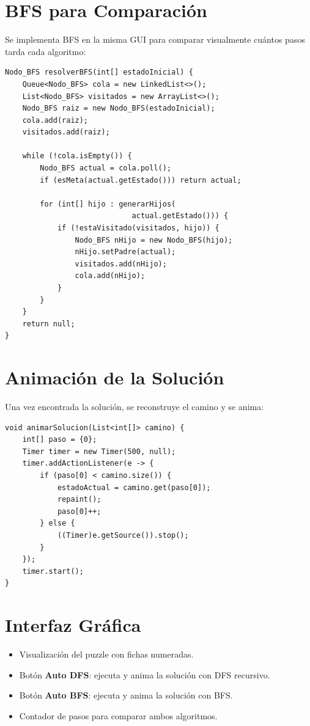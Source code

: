 \documentclass[12pt,a4paper]{article}
\begin{document}
\section{BFS para Comparación}

Se implementa BFS en la misma GUI para comparar visualmente cuántos pasos tarda cada algoritmo:

\begin{lstlisting}
Nodo_BFS resolverBFS(int[] estadoInicial) {
    Queue<Nodo_BFS> cola = new LinkedList<>();
    List<Nodo_BFS> visitados = new ArrayList<>();
    Nodo_BFS raiz = new Nodo_BFS(estadoInicial);
    cola.add(raiz);
    visitados.add(raiz);

    while (!cola.isEmpty()) {
        Nodo_BFS actual = cola.poll();
        if (esMeta(actual.getEstado())) return actual;

        for (int[] hijo : generarHijos(
                             actual.getEstado())) {
            if (!estaVisitado(visitados, hijo)) {
                Nodo_BFS nHijo = new Nodo_BFS(hijo);
                nHijo.setPadre(actual);
                visitados.add(nHijo);
                cola.add(nHijo);
            }
        }
    }
    return null;
}
\end{lstlisting}

\section{Animación de la Solución}

Una vez encontrada la solución, se reconstruye el camino y se anima:

\begin{lstlisting}
void animarSolucion(List<int[]> camino) {
    int[] paso = {0};
    Timer timer = new Timer(500, null);
    timer.addActionListener(e -> {
        if (paso[0] < camino.size()) {
            estadoActual = camino.get(paso[0]);
            repaint();
            paso[0]++;
        } else {
            ((Timer)e.getSource()).stop();
        }
    });
    timer.start();
}
\end{lstlisting}

\section{Interfaz Gráfica}

\begin{itemize}
  \item Visualización del puzzle con fichas numeradas.
  \item Botón \textbf{Auto DFS}: ejecuta y anima la solución con DFS recursivo.
  \item Botón \textbf{Auto BFS}: ejecuta y anima la solución con BFS.
  \item Contador de pasos para comparar ambos algoritmos.
\end{itemize}
\end{document}
